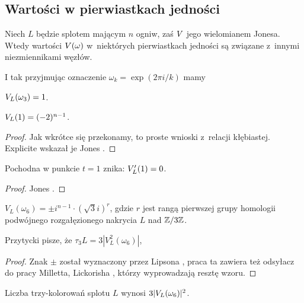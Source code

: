 
\subsection{Wartości w pierwiastkach jedności}
Niech $L$ będzie splotem mającym $n$ ogniw, zaś $V$ jego wielomianem Jonesa.
Wtedy wartości $V(\omega)$ w~niektórych pierwiastkach jedności są związane z~innymi niezmiennikami węzłów.

I tak przyjmując oznaczenie $\omega_k = \exp(2\pi i/k)$ mamy

\begin{proposition}
    \label{prp:jones_at_roots_of_unity}
    $V_L(\omega_3) = 1$.
\end{proposition}

\begin{proposition}
    $V_L(1) = (-2)^{n-1}$.
\end{proposition}

\begin{proof}
%
    Jak wkrótce się przekonamy, to proste wnioski z~relacji kłębiastej.
    Explicite wskazał je Jones \cite[twierdzenie 14, 15]{jones1985}.
\end{proof}

\begin{proposition}
    Pochodna w punkcie $t = 1$ znika: $V'_L(1) = 0$.
\end{proposition}

\begin{proof}
    Jones \cite[twierdzenie 16]{jones1985}.
\end{proof}

\begin{proposition}
    $V_L(\omega_6) = \pm i^{n-1} \cdot (\sqrt 3i)^r$, gdzie $r$ jest rangą pierwszej grupy homologii podwójnego rozgałęzionego nakrycia $L$ nad $\mathbb Z/3\mathbb Z$.
\end{proposition}

Przytycki \cite[s. 200]{przytycki1995} pisze, że $\tau_3 L = 3 |V_L^2 (\omega_6)|$,

\begin{proof}
%
    Znak $\pm$ został wyznaczony przez Lipsona \cite{lipson1986}, praca ta zawiera też odsyłacz do pracy Milletta, Lickorisha \cite{lickorish1986}, którzy wyprowadzają resztę wzoru.
\end{proof}

\begin{proposition}
    Liczba trzy-kolorowań splotu $L$ wynosi $3|V_L(\omega_6)|^2$.
\end{proposition}

